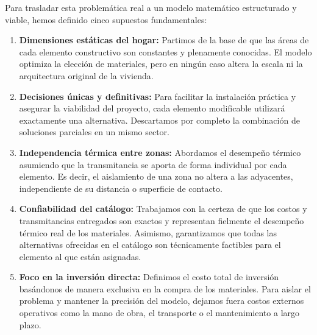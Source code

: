 Para trasladar esta problemática real a un modelo matemático estructurado y viable, hemos definido cinco supuestos fundamentales:\\
\begin{enumerate}
    \item \textbf{Dimensiones estáticas del hogar:} Partimos de la base de que las áreas de cada elemento constructivo son constantes y plenamente conocidas. El modelo optimiza la elección de materiales, pero en ningún caso altera la escala ni la arquitectura original de la vivienda.
    \item \textbf{Decisiones únicas y definitivas:} Para facilitar la instalación práctica y asegurar la viabilidad del proyecto, cada elemento modificable utilizará exactamente una alternativa. Descartamos por completo la combinación de soluciones parciales en un mismo sector.
    \item \textbf{Independencia térmica entre zonas:} Abordamos el desempeño térmico asumiendo que la transmitancia se aporta de forma individual por cada elemento. Es decir, el aislamiento de una zona no altera a las adyacentes, independiente de su distancia o superficie de contacto.
    \item \textbf{Confiabilidad del catálogo:} Trabajamos con la certeza de que los costos y transmitancias entregados son exactos y representan fielmente el desempeño térmico real de los materiales. Asimismo, garantizamos que todas las alternativas ofrecidas en el catálogo son técnicamente factibles para el elemento al que están asignadas.
    \item \textbf{Foco en la inversión directa:} Definimos el costo total de inversión basándonos de manera exclusiva en la compra de los materiales. Para aislar el problema y mantener la precisión del modelo, dejamos fuera costos externos operativos como la mano de obra, el transporte o el mantenimiento a largo plazo.
\end{enumerate}
